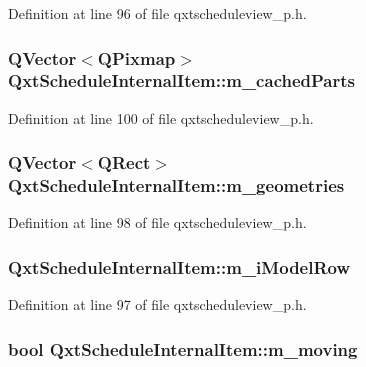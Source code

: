 Definition at line 96 of file qxtscheduleview\-\_\-p.\-h.

\hypertarget{class_qxt_schedule_internal_item_aad1d02d5bdf69dd78fc652bdab7be174}{
\subsubsection[{m\-\_\-cached\-Parts}]{\setlength{\rightskip}{0pt plus 5cm}Q\-Vector$<$Q\-Pixmap$>$ Qxt\-Schedule\-Internal\-Item\-::m\-\_\-cached\-Parts}}\label{class_qxt_schedule_internal_item_aad1d02d5bdf69dd78fc652bdab7be174}


Definition at line 100 of file qxtscheduleview\-\_\-p.\-h.

\hypertarget{class_qxt_schedule_internal_item_a1ff46bc8425f7b145f5f8e256730d121}{
\subsubsection[{m\-\_\-geometries}]{\setlength{\rightskip}{0pt plus 5cm}Q\-Vector$<$Q\-Rect$>$ Qxt\-Schedule\-Internal\-Item\-::m\-\_\-geometries}}\label{class_qxt_schedule_internal_item_a1ff46bc8425f7b145f5f8e256730d121}


Definition at line 98 of file qxtscheduleview\-\_\-p.\-h.

\hypertarget{class_qxt_schedule_internal_item_a793bd3bd5448bdb1f59bd3be1ac485f7}{
\subsubsection[{m\-\_\-i\-Model\-Row}]{ Qxt\-Schedule\-Internal\-Item\-::m\-\_\-i\-Model\-Row}}\label{class_qxt_schedule_internal_item_a793bd3bd5448bdb1f59bd3be1ac485f7}


Definition at line 97 of file qxtscheduleview\-\_\-p.\-h.

\hypertarget{class_qxt_schedule_internal_item_ad4852ad984c7d5d81bd423abc9da4a6c}{
\subsubsection[{m\-\_\-moving}]{\setlength{\rightskip}{0pt plus 5cm}bool Qxt\-Schedule\-Internal\-Item\-::m\-\_\-moving}}\label{class_qxt_schedule_internal_item_ad4852ad984c7d5d81bd423abc9da4a6c}


